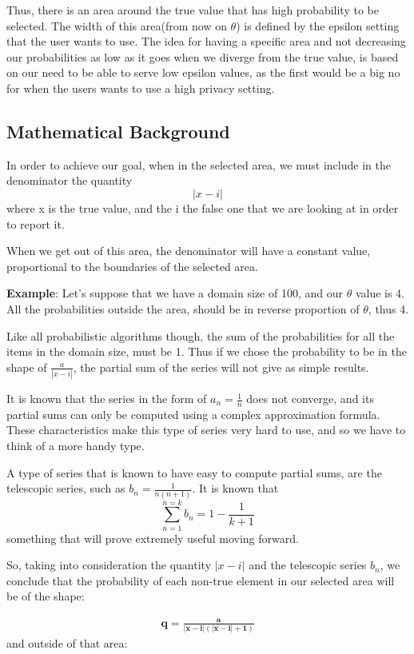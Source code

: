 Thus, there is an area around the true value that has high probability to be selected. The width of this area(from now on $\theta$) is defined by the epsilon setting that the user wants to use. The idea for having a specific area and not decreasing our probabilities as low as it goes when we diverge from the true value, is based on our need to be able to serve low epsilon values, as the first would be a big no for when the users wants to use a high privacy setting.

\subsection{Mathematical Background}

In order to achieve our goal, when in the selected area, we must include in the denominator the quantity 
$$
|x - i|
$$
where x is the true value, and the i the false one that we are looking at in order to report it.

When we get out of this area, the denominator will have a constant value, proportional to the boundaries of the selected area. 

\textbf{Example}: Let's suppose that we have a domain size of 100, and our $\theta$ value is 4. All the probabilities outside the area, should be in reverse proportion of $\theta$, thus 4.

Like all probabilistic algorithms though, the sum of the probabilities for all the items in the domain size, must be 1. Thus if we chose the probability to be in the shape of $\frac{a}{|x-i|}$, the partial sum of the series will not give as simple results.

It is known that the series in the form of $a_n = \frac{1}{n}$ does not converge, and its partial sums can only be computed using a complex approximation formula. These characteristics make this type of series very hard to use, and so we have to think of a more handy type.


A type of series that is known to have easy to compute partial sums, are the telescopic series, such as $b_n = \frac{1}{n (n+1)}$. It is known that 
$$
\sum_{n = 1}^{n = k} b_n = 1 - \frac{1}{k + 1}
$$
something that will prove extremely useful moving forward.

So, taking into consideration the quantity $|x - i|$ and the telescopic series $b_n$, we conclude that the probability of each non-true element in our selected area will be of the shape:

\begin{align}
    \mathbf{q = \frac{a}{|x-i|(|x-i| + 1)}}
\end{align}
and outside of that area:

